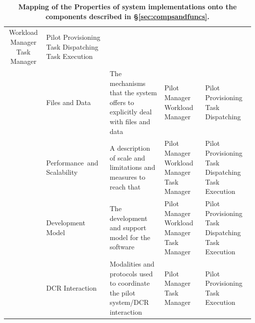 \documentclass{sig-alternate}
\begin{document}
\begin{table}
\begin{tabular}{c|p{3.6cm}|p{5cm}|p{2.7cm}|p{2.7cm}|}
  Workload Manager \newline
  Task Manager                       &
Pilot Provisioning \newline
  Task Dispatching \newline
  Task Execution \\
\cline{2-5}
                                     &
Files and Data                       &
The mechanisms that the system offers to explicitly deal with files and data &
Pilot Manager      \newline
   Workload Manager                  &
Pilot Provisioning \newline
  Task Dispatching \\
\cline{2-5}
                                     &
Performance~and    \newline
  Scalability                        &
A description of scale and limitations and measures to reach that &
Pilot Manager      \newline
  Workload Manager \newline
  Task Manager                       &
Pilot Provisioning \newline
  Task Dispatching \newline
  Task Execution \\
\cline{2-5}
                                     &
Development Model                    &
The development and support model for the software &
Pilot Manager      \newline
  Workload Manager \newline
  Task Manager                       &
Pilot Provisioning \newline
  Task Dispatching \newline
  Task Execution \\
\cline{2-5}
                                &
DCR Interaction                 &
Modalities and protocols used to coordinate the pilot system/DCR interaction &
Pilot Manager      \newline
  Task Manager                  &
Pilot Provisioning \newline
  Task Execution \\
\hline
\end{tabular}
\caption{\textbf{Mapping of the Properties of \pilot system implementations
    onto the components described in \S\ref{sec:compsandfuncs}.} }
\end{table}
\end{document}
